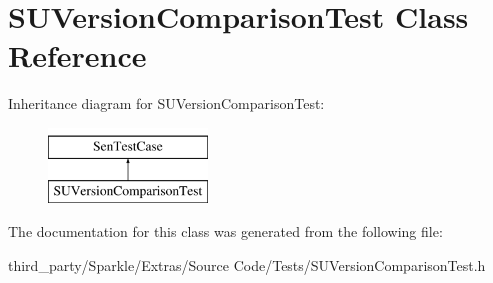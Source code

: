 \hypertarget{interface_s_u_version_comparison_test}{}\section{S\+U\+Version\+Comparison\+Test Class Reference}
\label{interface_s_u_version_comparison_test}
Inheritance diagram for S\+U\+Version\+Comparison\+Test\+:\begin{figure}[H]
\begin{center}
\leavevmode
\includegraphics[height=2.000000cm]{interface_s_u_version_comparison_test}
\end{center}
\end{figure}


The documentation for this class was generated from the following file\+:\begin{DoxyCompactItemize}
\item 
third\+\_\+party/\+Sparkle/\+Extras/\+Source Code/\+Tests/S\+U\+Version\+Comparison\+Test.\+h\end{DoxyCompactItemize}
